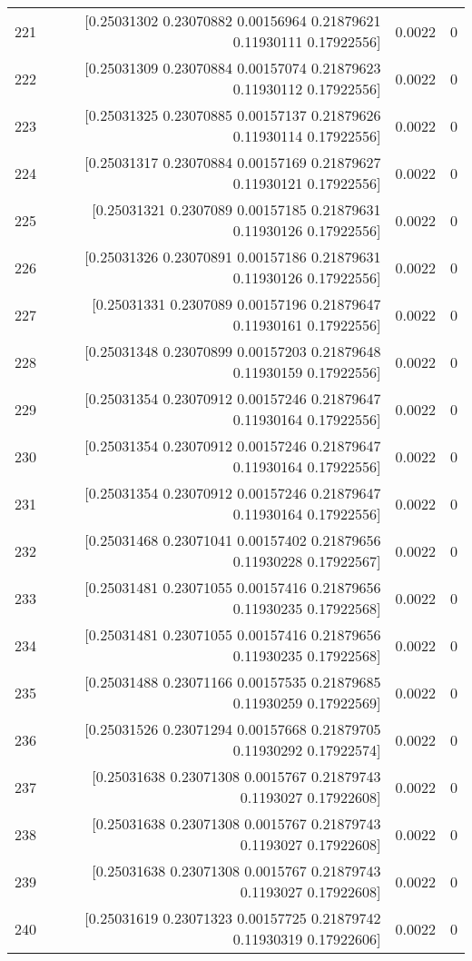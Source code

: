 \begin{longtable}{lrrr}
221 & [0.25031302 0.23070882 0.00156964 0.21879621 0.11930111 0.17922556] & 0.0022 & 0 \\
222 & [0.25031309 0.23070884 0.00157074 0.21879623 0.11930112 0.17922556] & 0.0022 & 0 \\
223 & [0.25031325 0.23070885 0.00157137 0.21879626 0.11930114 0.17922556] & 0.0022 & 0 \\
224 & [0.25031317 0.23070884 0.00157169 0.21879627 0.11930121 0.17922556] & 0.0022 & 0 \\
225 & [0.25031321 0.2307089  0.00157185 0.21879631 0.11930126 0.17922556] & 0.0022 & 0 \\
226 & [0.25031326 0.23070891 0.00157186 0.21879631 0.11930126 0.17922556] & 0.0022 & 0 \\
227 & [0.25031331 0.2307089  0.00157196 0.21879647 0.11930161 0.17922556] & 0.0022 & 0 \\
228 & [0.25031348 0.23070899 0.00157203 0.21879648 0.11930159 0.17922556] & 0.0022 & 0 \\
229 & [0.25031354 0.23070912 0.00157246 0.21879647 0.11930164 0.17922556] & 0.0022 & 0 \\
230 & [0.25031354 0.23070912 0.00157246 0.21879647 0.11930164 0.17922556] & 0.0022 & 0 \\
231 & [0.25031354 0.23070912 0.00157246 0.21879647 0.11930164 0.17922556] & 0.0022 & 0 \\
232 & [0.25031468 0.23071041 0.00157402 0.21879656 0.11930228 0.17922567] & 0.0022 & 0 \\
233 & [0.25031481 0.23071055 0.00157416 0.21879656 0.11930235 0.17922568] & 0.0022 & 0 \\
234 & [0.25031481 0.23071055 0.00157416 0.21879656 0.11930235 0.17922568] & 0.0022 & 0 \\
235 & [0.25031488 0.23071166 0.00157535 0.21879685 0.11930259 0.17922569] & 0.0022 & 0 \\
236 & [0.25031526 0.23071294 0.00157668 0.21879705 0.11930292 0.17922574] & 0.0022 & 0 \\
237 & [0.25031638 0.23071308 0.0015767  0.21879743 0.1193027  0.17922608] & 0.0022 & 0 \\
238 & [0.25031638 0.23071308 0.0015767  0.21879743 0.1193027  0.17922608] & 0.0022 & 0 \\
239 & [0.25031638 0.23071308 0.0015767  0.21879743 0.1193027  0.17922608] & 0.0022 & 0 \\
240 & [0.25031619 0.23071323 0.00157725 0.21879742 0.11930319 0.17922606] & 0.0022 & 0 \\

\end{longtable}
